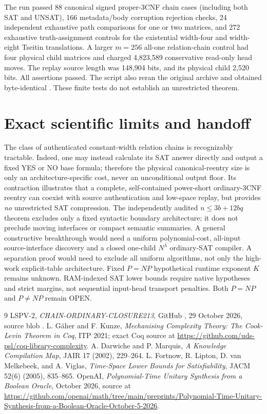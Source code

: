 \documentclass[11pt]{article}
\begin{document}
The run passed 88 canonical signed proper-3CNF chain cases (including both SAT and UNSAT), 166 metadata/body corruption rejection checks, 24 independent exhaustive path comparisons for one or two matrices, and 272 exhaustive truth-assignment controls for the existential width-four and width-eight Tseitin translations. A larger $m=256$ all-one relation-chain control had four physical child matrices and charged 4,823,589 conservative read-only head moves. The replay source length was 148,904 bits, and its physical child 2,520 bits. All assertions passed. The script also reran the original archive and obtained byte-identical . These finite tests do not establish an unrestricted theorem.

\section{Exact scientific limits and handoff}
The class of authenticated constant-width relation chains is recognizably tractable. Indeed, one may instead calculate its SAT answer directly and output a fixed YES or NO base formula; therefore the physical canonical-reentry size is only an architecture-specific cost, never an unconditional output floor. Its contraction illustrates that a complete, self-contained power-short ordinary-3CNF reentry can coexist with source authentication and low-space replay, but provides \emph{no} unrestricted SAT compression. The independently audited $n\le3b+12bq$ theorem excludes only a fixed syntactic boundary architecture; it does not preclude moving interfaces or compact semantic summaries. A general constructive breakthrough would need a uniform polynomial-cost, all-input source-interface discovery and a closed one-child $N^\lambda$ ordinary-SAT compiler. A separation proof would need to exclude all uniform algorithms, not only the high-work explicit-table architecture. Fixed $P=NP$ hypothetical runtime exponent $K$ remains unknown. RAM-indexed SAT lower bounds require native hypotheses and strict margins, not sequential input-head transport penalties. Both $P=NP$ and $P\ne NP$ remain OPEN.

\begin{thebibliography}{9}
 LSPV-2, \emph{CHAIN-ORDINARY-CLOSURE213}, GitHub , 29 October 2026, source blob .
 L. G\"aher and F. Kunze, \emph{Mechanising Complexity Theory: The Cook-Levin Theorem in Coq}, ITP 2021; exact Coq source at \url{https://github.com/uds-psl/coq-library-complexity}.
 A. Darwiche and P. Marquis, \emph{A Knowledge Compilation Map}, JAIR 17 (2002), 229--264.
 L. Fortnow, R. Lipton, D. van Melkebeek, and A. Viglas, \emph{Time-Space Lower Bounds for Satisfiability}, JACM 52(6) (2005), 835--865.
 OpenAI, \emph{Polynomial-Time Unitary Synthesis from a Boolean Oracle}, October 2026, source at \url{https://github.com/openai/math/tree/main/preprints/Polynomial-Time-Unitary-Synthesis-from-a-Boolean-Oracle-October-5-2026}.
\end{thebibliography}
\end{document}
